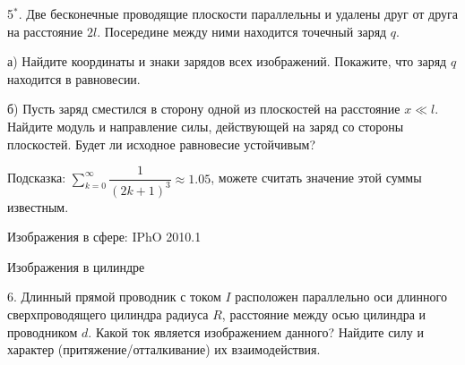 \documentclass[14pt]{article}
\begin{document}
5$^*$. Две бесконечные проводящие плоскости параллельны и удалены друг от друга на расстояние $2l$. Посередине между ними находится точечный заряд $q$.

а) Найдите координаты и знаки зарядов всех изображений. Покажите, что заряд $q$ находится в равновесии.

б) Пусть заряд сместился в сторону одной из плоскостей на расстояние $x\ll l$. Найдите модуль и направление силы, действующей на заряд со стороны плоскостей. Будет ли исходное равновесие устойчивым?

Подсказка: $\sum\limits_{k=0}^\infty \dfrac{1}{(2k+1)^3}\approx 1.05$, можете считать значение этой суммы известным.

\vspace{5mm}
{\large{Изображения в сфере: IPhO 2010.1}}
\vspace{3mm}

{\large{Изображения в цилиндре}}
\vspace{3mm}

6. Длинный прямой проводник с током $I$ расположен параллельно оси длинного сверхпроводящего цилиндра радиуса $R$, расстояние между осью цилиндра и проводником $d$. Какой ток является изображением данного? Найдите силу и характер (притяжение/отталкивание) их взаимодействия.
\end{document}
